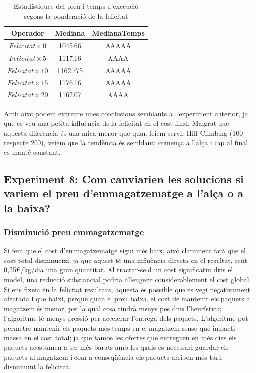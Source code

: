 \documentclass[a4paper]{article}
\begin{document}
	\begin{table}[H]
		\centering
		\begin{tabular}{|c|c|c|}
			\hline
			\textbf{Operador} & \textbf{Mediana} & \textbf{MedianaTemps} \\
			\hline
			$Felicitat \times 0$ & 1045.66 & AAAAA\\
			\hline
			$Felicitat \times 5$ & 1117.16 & AAAA\\
			\hline
			$Felicitat \times 10$ & 1162.775 & AAAAA\\
			\hline
			$Felicitat \times 15$ & 1176.16 & AAAAA\\
			\hline
			$Felicitat \times 20$ & 1162.07 & AAAA\\
			\hline
		\end{tabular}
		\caption{Estadístiques del preu i temps d'execució segons la ponderació de la felicitat}
		\label{tab:exp7_estadisticas}
	\end{table}
	
	Amb això podem extreure unes conclusions semblants a l'experiment anterior, ja que es veu una petita influència de la felicitat en el cost final. Malgrat que aquesta diferència és una mica menor que quan feiem servir Hill Climbing (100 respecte 200), veiem que la tendència és semblant: comença a l'alça i cap al final es manté constant. \\
	
	
	\subsection{Experiment 8: Com canviarien les solucions si variem el preu d'emmagatzematge a l'alça o a la baixa?}
	
	\subsubsection{Disminució preu emmagatzematge}
	
	Si fem que el cost d'emmagatzematge sigui més baix, això clarament farà que el cost total disminueixi, ja que aquest té una influència directa en el resultat, sent 0,25€/kg/dia una gran quantitat. Al tractar-se d un  cost significatiu dins el model, una reducció substancial podria alleugerir considerablement el cost global. Si ens fixem en la felicitat resultant, aquesta és possible que es vegi negativament afectada i que baixi, perquè quan el preu baixa, el cost de mantenir els paquets al magatzem és menor, per la qual cosa tindrà menys pes dins l'heurística; l'algoritme té menys pressió per accelerar l'entrega dels paquets. L'algoritme pot permetre mantenir els paquets més temps en el magatzem sense que impacti massa en el cost total; ja que també les ofertes que entreguen en més dies els paquets acostumen a ser més barats amb les quals és necessari guardar els paquets al magatzem i com a conseqüència els paquets arriben més tard disminuint la felicitat.\\
	
\end{document}
